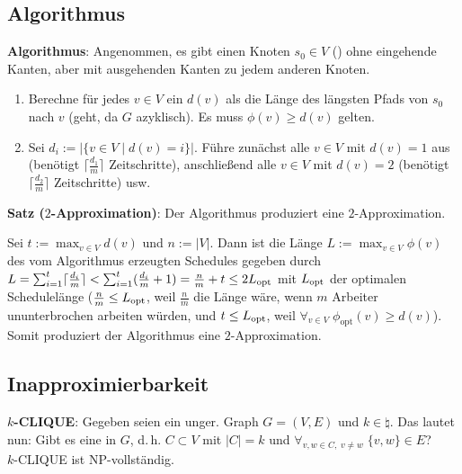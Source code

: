\subsection{%
    Algorithmus%
}

\textbf{Algorithmus}:
Angenommen, es gibt einen Knoten $s_0 \in V$ ()
ohne eingehende Kanten, aber mit ausgehenden Kanten zu jedem anderen Knoten.
\begin{enumerate}
    \item
    Berechne für jedes $v \in V$ ein  $d(v)$ als
    die Länge des längsten Pfads von $s_0$ nach $v$ (geht, da $G$ azyklisch).
    Es muss $\phi(v) \ge d(v)$ gelten.

    \item
    Sei $d_i := |\{v \in V \;|\; d(v) = i\}|$.
    Führe zunächst alle $v \in V$ mit $d(v) = 1$ aus
    (benötigt $\lceil\frac{d_1}{m}\rceil$ Zeitschritte),
    anschließend alle $v \in V$ mit $d(v) = 2$
    (benötigt $\lceil\frac{d_2}{m}\rceil$ Zeitschritte) usw.
\end{enumerate}

\textbf{Satz ($2$-Approximation)}:
Der Algorithmus produziert eine $2$-Approximation.

\begin{Beweis}
    Sei $t := \max_{v \in V} d(v)$ und $n := |V|$.
    Dann ist die Länge $L := \max_{v \in V} \phi(v)$ des
    vom Algorithmus erzeugten Schedules gegeben durch
    $L
    = \sum_{i=1}^t \lceil\frac{d_i}{m}\rceil
    < \sum_{i=1}^t (\frac{d_i}{m} + 1)
    = \frac{n}{m} + t
    \le 2L_{\text{opt}}$
    mit $L_{\text{opt}}$ der optimalen Schedulelänge
    ($\frac{n}{m} \le L_{\text{opt}}$, weil $\frac{n}{m}$ die Länge wäre,
    wenn $m$ Arbeiter ununterbrochen arbeiten würden, und
    $t \le L_{\text{opt}}$, weil $\forall_{v \in V}\; \phi_{\text{opt}}(v) \ge d(v)$).
    Somit produziert der Algorithmus eine $2$-Approximation.
\end{Beweis}

\pagebreak

\subsection{%
    Inapproximierbarkeit%
}

\textbf{$k$-CLIQUE}:
Gegeben seien ein unger. Graph $G = (V, E)$ und $k \in \natural$.
Das  lautet nun:
Gibt es eine  in $G$, d.\,h. $C \subset V$ mit $|C| = k$ und
$\forall_{v, w \in C,\; v \not= w}\; \{v, w\} \in E$?\\
$k$-CLIQUE ist NP-vollständig.

